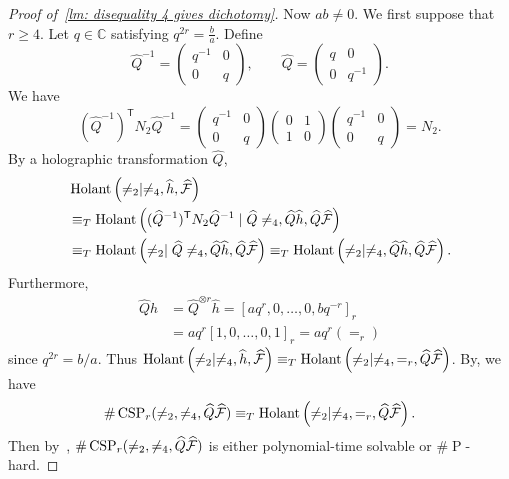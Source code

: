 \begin{proof}[Proof of~\cref{lm: disequality 4 gives dichotomy}]
    Now $ab\neq 0$. We first suppose that $r\geq 4$. Let $q\in \mathbb{C}$ satisfying $q^{2r}=\frac{b}{a}$. Define 
    \[
        \widehat{Q}^{-1}
        =
        \begin{pmatrix}
        q^{-1}&0\\
        0&q
        \end{pmatrix},
        \qquad
        \widehat Q
        =
        \begin{pmatrix}
        q&0\\
        0&q^{-1}
        \end{pmatrix}.
    \]
    We have 
    \[
        (\widehat{Q}^{-1})^{\mathsf T}N_2\widehat Q^{-1}
        =
        \begin{pmatrix}
        q^{-1}&0\\
        0&q
        \end{pmatrix}
        \begin{pmatrix}
        0&1\\
        1&0
        \end{pmatrix}
        \begin{pmatrix}
        q^{-1}&0\\
        0&q
        \end{pmatrix}
        =N_2.
    \]
    By a holographic transformation $\widehat{Q}$,
    \[
    \begin{aligned}
        &\operatorname{Holant}\left(\neq_2\mid \neq_4,\widehat{h},\widehat{\mathcal{F}}\right)\\
        &\equiv_T \operatorname{Holant}\left((\widehat{Q}^{-1})^{\mathsf T}N_2\widehat{Q}^{-1}\mid \widehat{Q}\neq_4,\widehat{Q}\widehat{h},\widehat{Q}\widehat{\mathcal{F}}\right)\\
        &\equiv_T \operatorname{Holant}\left(\neq_2\mid \widehat{Q}\neq_4,\widehat{Q}\widehat{h},\widehat{Q}\widehat{\mathcal{F}}\right)
        \equiv_T \operatorname{Holant}\left(\neq_2\mid \neq_4,\widehat{Q}\widehat{h},\widehat{Q}\widehat{\mathcal{F}}\right).
    \end{aligned}
    \]
    Furthermore,
    \[
    \begin{aligned}
        \widehat{Q}\widehat{h}
        &=\widehat{Q}^{\otimes r}\widehat{h}
        =[aq^r,0,\dots,0,bq^{-r}]_r\\
        &=aq^r[1,0,\dots,0,1]_r=aq^r(=_r)
    \end{aligned}
    \]
    since $q^{2r}=b/a$. Thus $\operatorname{Holant}\left(\neq_2\mid \neq_4,\widehat{h},\widehat{\mathcal{F}}\right)\equiv_T \operatorname{Holant}\left(\neq_2\mid \neq_4,=_r,\widehat{Q}\widehat{\mathcal{F}}\right)$. By\cite{odd_holant_real}, we have
    \[
        \#\operatorname{CSP}_r(\neq_2,\neq_4,\widehat{Q}\widehat{\mathcal{F}})
        \equiv_T \operatorname{Holant}\left(\neq_2\mid \neq_4,=_r,\widehat{Q}\widehat{\mathcal{F}}\right).
    \]
    Then by~\cite{odd_holant_real}, $\#\operatorname{CSP}_r(\neq_2,\neq_4,\widehat{Q}\widehat{\mathcal{F}})$ is either polynomial-time solvable or $\#\operatorname{P}$-hard.


\end{proof}
